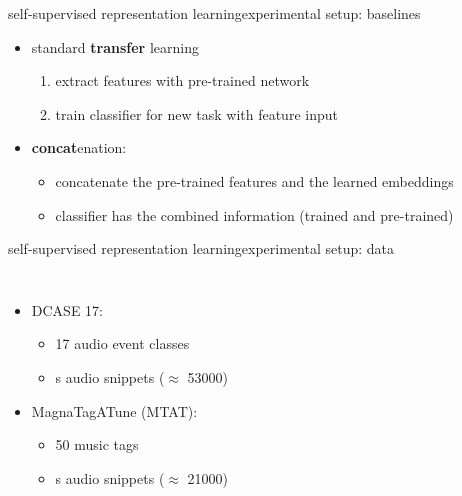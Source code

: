 \begin{frame}{self-supervised representation learning}{experimental setup: baselines}
            \begin{itemize}
                \item   standard \textbf{transfer} learning
                    \begin{enumerate}
                        \item   extract features with pre-trained network
                        \item   train classifier for new task with feature input
                    \end{enumerate}
                    \bigskip
                \item   \textbf{concat}enation:
                    \begin{itemize}
                        \item   concatenate the pre-trained features and the learned embeddings
                        \item   classifier has the combined information (trained and pre-trained)
                    \end{itemize}
            \end{itemize}
\end{frame}

\begin{frame}{self-supervised representation learning}{experimental setup: data}
    \begin{columns}
            \begin{itemize}
                \item   DCASE 17:
                    \begin{itemize}
                        \item   17 audio event classes
                        \item   \unit[10]{s} audio snippets ($\approx$ 53000)
                    \end{itemize}
                \bigskip
                \item   MagnaTagATune (MTAT):
                    \begin{itemize}
                        \item   50 music tags
                        \item   \unit[30]{s} audio snippets ($\approx$ 21000)
                    \end{itemize}
            \end{itemize}
    \end{columns}
\end{frame}

